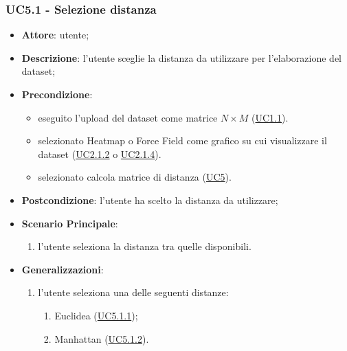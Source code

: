     \subsubsection{UC5.1 - Selezione distanza}
    \label{uc5.1}
    \begin{itemize}
    \item \textbf{Attore}: utente;
    \item \textbf{Descrizione}: l'utente sceglie la distanza da utilizzare per l'elaborazione del dataset;
    \item \textbf{Precondizione}: 
    \begin{itemize}
        \item eseguito l'upload del dataset come matrice $N\times M$ (\hyperref[uc1.1]{UC1.1}).
        \item selezionato Heatmap o Force Field come grafico su cui visualizzare il dataset (\hyperref[uc2.1.2]{UC2.1.2} o \hyperref[uc2.1.4]{UC2.1.4}).
        \item selezionato calcola matrice di distanza (\hyperref[uc5]{UC5}).
    \end{itemize}  
    \item \textbf{Postcondizione}: l'utente ha scelto la distanza da utilizzare;
    \item \textbf{Scenario Principale}: 
    \begin{enumerate}
        \item l'utente seleziona la distanza tra quelle disponibili.
    \end{enumerate}
    \item \textbf{Generalizzazioni}:
        \begin{enumerate}
            \item l'utente seleziona una delle seguenti distanze:
                \begin{enumerate}
                    \item Euclidea (\hyperref[uc5.1.1]{UC5.1.1});
                    \item Manhattan (\hyperref[uc5.1.2]{UC5.1.2}).
                \end{enumerate}
        \end{enumerate}  
    \end{itemize}
    
